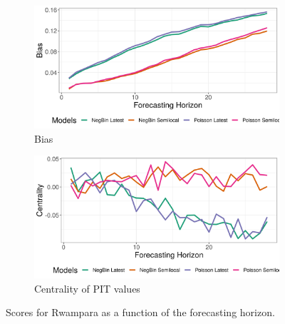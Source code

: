 \begin{figure}[H]
\begin{subfigure}{0.5\textwidth}
  \centering
  \includegraphics[width=\linewidth]{../output/Rwampara_bias.png}  
  \caption{Bias}
  \label{fig:Rwampara_scores_3}
\end{subfigure}
\begin{subfigure}{0.5\textwidth}
  \centering
  \includegraphics[width=\linewidth]{../output/Rwampara_centrality.png}  
  \caption{Centrality of PIT values}
  \label{fig:Rwampara_scores_4}
\end{subfigure}
  \caption{Scores for Rwampara as a function of the forecasting horizon.}

  \label{fig:nat_scores}
\end{figure}
